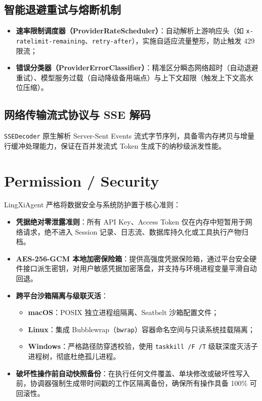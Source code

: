 \documentclass[11pt,a4paper]{article}
\begin{document}
\subsection{智能退避重试与熔断机制}
\begin{itemize}
    \item \textbf{速率限制调度器（ProviderRateScheduler）}：自动解析上游响应头（如 \texttt{x-ratelimit-remaining}、\texttt{retry-after}），实施自适应流量整形，防止触发 429 限流；
    \item \textbf{错误分类器（ProviderErrorClassifier）}：精准区分瞬态网络超时（自动退避重试）、模型服务过载（自动降级备用端点）与上下文超限（触发上下文高水位压缩）。
\end{itemize}

\subsection{网络传输流式协议与 SSE 解码}
\texttt{SSEDecoder} 原生解析 Server-Sent Events 流式字节序列，具备零内存拷贝与增量行缓冲处理能力，保证在百并发流式 Token 生成下的纳秒级派发性能。

\section{Permission / Security}

LingXiAgent 严格将数据安全与系统防护置于核心准则：

\begin{itemize}
    \item \textbf{凭据绝对零泄露准则}：所有 API Key、Access Token 仅在内存中短暂用于网络请求，绝不进入 Session 记录、日志流、数据库持久化或工具执行产物归档。
    \item \textbf{AES-256-GCM 本地加密保险箱}：提供高强度凭据保险箱，通过平台安全硬件接口派生密钥，对用户敏感凭据加密落盘，并支持与环境进程变量平滑自动回退。
    \item \textbf{跨平台沙箱隔离与级联灭活}：
    \begin{itemize}
        \item \textbf{macOS}：POSIX 独立进程组隔离、Seatbelt 沙箱配置文件；
        \item \textbf{Linux}：集成 Bubblewrap（\texttt{bwrap}）容器命名空间与只读系统挂载隔离；
        \item \textbf{Windows}：严格路径防穿透校验，使用 \texttt{taskkill /F /T} 级联深度灭活子进程树，彻底杜绝孤儿进程。
    \end{itemize}
    \item \textbf{破坏性操作前自动快照备份}：在执行任何文件覆盖、单块修改或破坏性写入前，协调器强制生成带时间戳的工作区隔离备份，确保所有操作具备 100\% 可回滚性。
\end{itemize}
\end{document}
